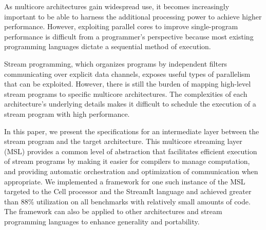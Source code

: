 %
%
%
%
%
%
%
%
%
% 
% 
%

As multicore architectures gain widespread use, it becomes
increasingly important to be able to harness the additional processing
power to achieve higher performance. However, exploiting parallel
cores to improve single-program performance is difficult from a
programmer's perspective because most existing programming languages
dictate a sequential method of execution.

Stream programming, which organizes programs by independent filters
communicating over explicit data channels,  exposes useful types of
parallelism that can be exploited. However, there is still the burden
of mapping high-level stream programs to specific multicore
architectures. The complexities of each architecture's underlying
details makes it difficult to schedule the execution of a stream
program with high performance.

In this paper, we present the specifications for an intermediate layer
between the stream program and the target architecture. This multicore
streaming layer (MSL) provides a common level of abstraction that
facilitates efficient execution of stream programs by making it easier
for compilers to manage computation, and providing automatic
orchestration and optimization of communication when appropriate. We
implemented a framework for one such instance of the MSL targeted to
the Cell processor and the StreamIt language and achieved greater than
88\% utilization on all benchmarks with relatively small amounts of
code. The framework can also be applied to other architectures and
stream programming languages to enhance generality and portability.

